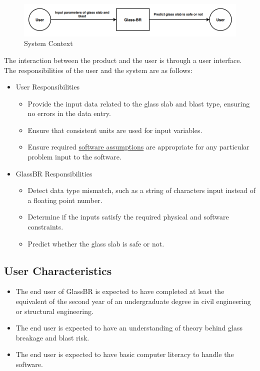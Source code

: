\documentclass[12pt]{article}
\begin{document}
\begin{figure}
\begin{center}
\includegraphics[width=\textwidth]{../../../../datafiles/glassbr/SystemContextFigure.png}
\caption{System Context}
\label{Figure:sysCtxDiag}
\end{center}
\end{figure}
The interaction between the product and the user is through a user interface. The responsibilities of the user and the system are as follows:

\begin{itemize}
\item{User Responsibilities}
\begin{itemize}
\item{Provide the input data related to the glass slab and blast type, ensuring no errors in the data entry.}
\item{Ensure that consistent units are used for input variables.}
\item{Ensure required \hyperref[Sec:Assumps]{software assumptions} are appropriate for any particular problem input to the software.}
\end{itemize}
\item{GlassBR Responsibilities}
\begin{itemize}
\item{Detect data type mismatch, such as a string of characters input instead of a floating point number.}
\item{Determine if the inputs satisfy the required physical and software constraints.}
\item{Predict whether the glass slab is safe or not.}
\end{itemize}
\end{itemize}
\subsection{User Characteristics}
\label{Sec:UserChars}
\begin{itemize}
\item{The end user of GlassBR is expected to have completed at least the equivalent of the second year of an undergraduate degree in civil engineering or structural engineering.}
\item{The end user is expected to have an understanding of theory behind glass breakage and blast risk.}
\item{The end user is expected to have basic computer literacy to handle the software.}
\end{itemize}
\end{document}

